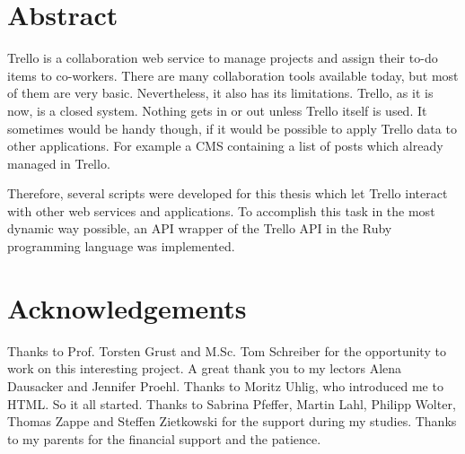 \documentclass[twoside,12pt,a4paper, parskip=full-]{report}
\begin{document}

\setcounter{page}{1}


\onehalfspacing
\setlength{\parskip}{1ex plus 0.5ex minus 0.2ex}

\section*{Abstract}

Trello is a collaboration web service to manage projects and assign their to-do items to co-workers. There are many collaboration tools available today, but most of them are very basic. Nevertheless, it also has its limitations. Trello, as it is now, is a closed system. Nothing gets in or out unless Trello itself is used. It sometimes would be handy though, if it would be possible to apply Trello data to other applications. For example a CMS containing a list of posts which already managed in Trello.
 
Therefore, several scripts were developed for this thesis which let Trello interact with other web services and applications. To accomplish this task in the most dynamic way possible, an API wrapper of the Trello API in the Ruby programming language was implemented.\\[5mm]

\newpage

\section*{Acknowledgements}
Thanks to Prof. Torsten Grust and M.Sc. Tom Schreiber for the opportunity to work on this interesting project. A great thank you to my lectors Alena Dausacker and Jennifer Proehl. Thanks to Moritz Uhlig, who introduced me to HTML. So it all started. Thanks to Sabrina Pfeffer, Martin Lahl, Philipp Wolter, Thomas Zappe and Steffen Zietkowski for the support during my studies. Thanks to my parents for the financial support and the patience.

\cleardoublepage

\end{document}
